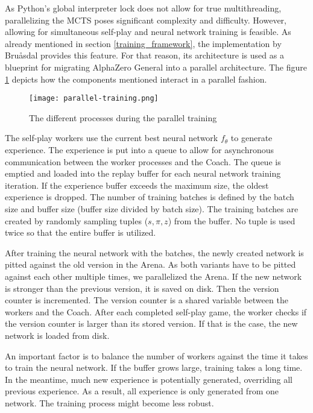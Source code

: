 As Python's global interpreter lock \cite{noauthor_globalinterpreterlock_nodate} does not allow for true multithreading, parallelizing the MCTS poses significant complexity and difficulty. However, allowing for simultaneous self-play and neural network training is feasible. As already mentioned in section \ref{training_framework}, the implementation by Bruåsdal \cite{bruasdal_deep_2020} provides this feature. For that reason, its architecture is used as a blueprint for migrating AlphaZero General into a parallel architecture. The figure \ref{parallel_training_pipeline} depicts how the components mentioned interact in a parallel fashion.

\begin{figure}
    \centering
    \texttt{[image: parallel-training.png]}
    \caption{The different processes during the parallel training \cite[cf. p. 45]{bruasdal_deep_2020}}
    \label{parallel_training_pipeline}
\end{figure}

The self-play workers use the current best neural network $f_{\theta}$ to generate experience. The experience is put into a queue to allow for asynchronous communication between the worker processes and the Coach. The queue is emptied and loaded into the replay buffer for each neural network training iteration. If the experience buffer exceeds the maximum size, the oldest experience is dropped. The number of training batches is defined by the batch size and buffer size (buffer size divided by batch size). The training batches are created by randomly sampling tuples ($s, \pi, z$) from the buffer. No tuple is used twice so that the entire buffer is utilized.

After training the neural network with the batches, the newly created network is pitted against the old version in the Arena. As both variants have to be pitted against each other multiple times, we parallelized the Arena. If the new network is stronger than the previous version, it is saved on disk. Then the version counter is incremented. The version counter is a shared variable between the workers and the Coach. After each completed self-play game, the worker checks if the version counter is larger than its stored version. If that is the case, the new network is loaded from disk.

An important factor is to balance the number of workers against the time it takes to train the neural network. If the buffer grows large, training takes a long time. In the meantime, much new experience is potentially generated, overriding all previous experience. As a result, all experience is only generated from one network. The training process might become less robust.

